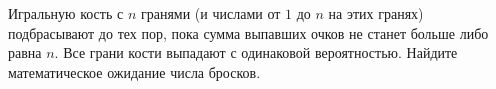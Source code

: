 \documentclass{article}
\begin{document}
Игральную кость с $n$ гранями (и числами от $1$ до $n$ на этих гранях) подбрасывают до тех пор, пока сумма выпавших очков не станет больше либо равна $n$. Все грани кости выпадают с одинаковой вероятностью. Найдите математическое ожидание числа бросков.
\end{document}
